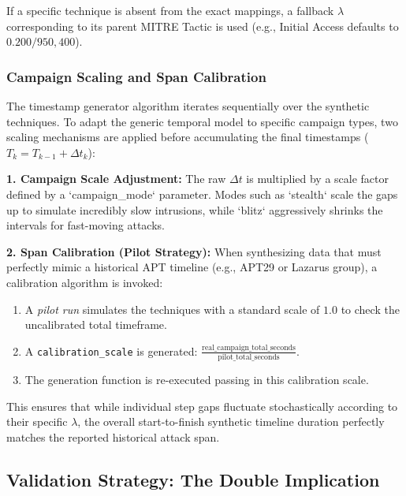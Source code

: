 If a specific technique is absent from the exact mappings, a fallback $\lambda$ corresponding to its parent MITRE Tactic is used (e.g., Initial Access defaults to $0.200 / 950,400$).

\subsubsection{Campaign Scaling and Span Calibration}

The timestamp generator algorithm iterates sequentially over the synthetic techniques. To adapt the generic temporal model to specific campaign types, two scaling mechanisms are applied before accumulating the final timestamps ($T_k = T_{k-1} + \Delta t_k$):

\textbf{1. Campaign Scale Adjustment:} The raw $\Delta t$ is multiplied by a scale factor defined by a `campaign\_mode` parameter. Modes such as `stealth` scale the gaps up to simulate incredibly slow intrusions, while `blitz` aggressively shrinks the intervals for fast-moving attacks.

\textbf{2. Span Calibration (Pilot Strategy):} When synthesizing data that must perfectly mimic a historical APT timeline (e.g., APT29 or Lazarus group), a calibration algorithm is invoked:
\begin{enumerate}
    \item A \textit{pilot run} simulates the techniques with a standard scale of $1.0$ to check the uncalibrated total timeframe.
    \item A \texttt{calibration\_scale} is generated: $\frac{\text{real\_campaign\_total\_seconds}}{\text{pilot\_total\_seconds}}$.
    \item The generation function is re-executed passing in this calibration scale.
\end{enumerate}

This ensures that while individual step gaps fluctuate stochastically according to their specific $\lambda$, the overall start-to-finish synthetic timeline duration perfectly matches the reported historical attack span.

\subsection{Validation Strategy: The Double Implication}
\label{subsec:validation_strategy}

